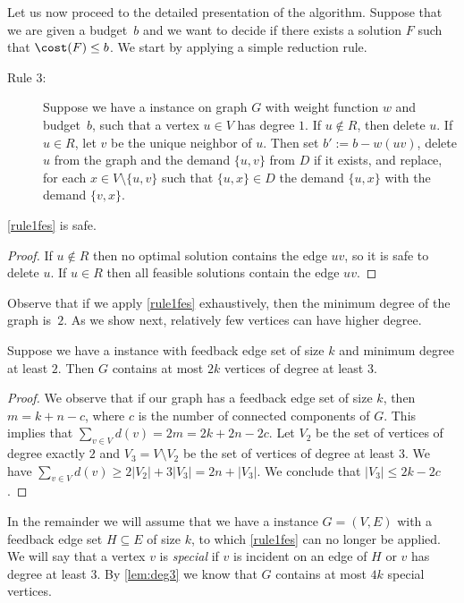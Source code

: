 Let us now proceed to the detailed presentation of the algorithm. Suppose that
we are given 
%
%
a budget~$b$ and we want to decide if there exists a \SF solution $F$ such
that $\cost(F)\le b$.
%
We start by applying a simple reduction rule.

\begin{description} 
\item[Rule 3:] Suppose we have a \SF instance on
graph $G$ with weight function $w$ and budget~$b$, such that a vertex $u\in V$
has degree $1$.  If $u\not\in R$, then delete $u$.  If $u\in R$, let $v$ be the
unique neighbor of $u$. Then  set $b':=b-w(uv)$, delete $u$ from the graph and
the demand $\{u,v\}$ from $D$ if it exists, and replace, for each $x\in
V\setminus\{u,v\}$ such that $\{u,x\}\in D$ the demand $\{u,x\}$ with the
demand $\{v,x\}$.
\end{description}

\begin{lemma}\label{lem:leaf} %
\ref{rule1fes} is safe. 
\end{lemma}

%
\begin{proof}%
If $u\not\in R$ then no optimal solution contains the edge $uv$,
so it is safe to delete $u$. If $u\in R$ then all feasible solutions contain
the edge $uv$. \end{proof}
%

Observe that if we apply \ref{rule1fes} exhaustively, then the minimum degree of the graph is~$2$. As we show next,
relatively few vertices can have higher degree.

\begin{lemma}\label{lem:deg3} %
Suppose we have a \SF instance with feedback edge
set of size $k$ and minimum degree at least $2$.  Then $G$ contains at most
$2k$ vertices of degree at least $3$. 
\end{lemma}

%
\begin{proof}%
We observe that if our graph has a feedback edge set of size
$k$, then $m= k+n-c$, where $c$ is the number of connected components of $G$.
This implies that $\sum_{v\in V}d(v) = 2m = 2k+2n-2c$. Let $V_2$ be the set of
vertices of degree exactly $2$ and $V_3=V\setminus V_2$ be the set of vertices
of degree at least $3$. We have $\sum_{v\in V}d(v) \ge 2|V_2|+3|V_3| = 2n
+|V_3|$. We conclude that $|V_3|\le 2k-2c$.  \end{proof}
%


In the remainder we will assume that we have a \SF instance $G=(V,E)$ with a
feedback edge set $H\subseteq E$ of size $k$, to which \ref{rule1fes} can no longer be
applied. We will say that a vertex $v$ is \emph{special} if $v$ is incident on
an edge of $H$ or $v$ has degree at least $3$. By \cref{lem:deg3} we know that
$G$ contains at most $4k$ special vertices.

